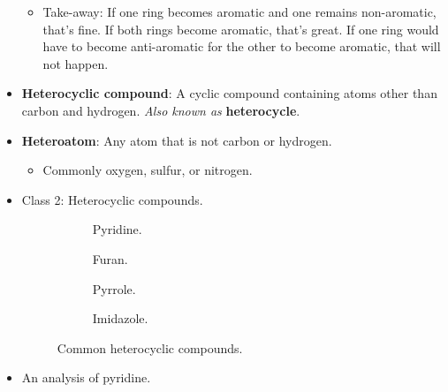 \documentclass[../notes.tex]{subfiles}
\begin{document}
\begin{itemize}
\begin{itemize}
        \item Take-away: If one ring becomes aromatic and one remains non-aromatic, that's fine. If both rings become aromatic, that's great. If one ring would have to become anti-aromatic for the other to become aromatic, that will not happen.
    \end{itemize}
    \item \textbf{Heterocyclic compound}: A cyclic compound containing atoms other than carbon and hydrogen. \emph{Also known as} \textbf{heterocycle}.
    \item \textbf{Heteroatom}: Any atom that is not carbon or hydrogen.
    \begin{itemize}
        \item Commonly oxygen, sulfur, or nitrogen.
    \end{itemize}
    \item Class 2: Heterocyclic compounds.
    \begin{figure}[H]
        \centering
        \footnotesize
        \begin{subfigure}[b]{0.15\linewidth}
            \centering
            \caption{Pyridine.}
            \label{fig:commonHeterocyclesa}
        \end{subfigure}
        \begin{subfigure}[b]{0.15\linewidth}
            \centering
            \caption{Furan.}
            \label{fig:commonHeterocyclesb}
        \end{subfigure}
        \begin{subfigure}[b]{0.15\linewidth}
            \centering
            \vspace{1em}
            \caption{Pyrrole.}
            \label{fig:commonHeterocyclesc}
        \end{subfigure}
        \begin{subfigure}[b]{0.15\linewidth}
            \centering
            \vspace{1em}
            \caption{Imidazole.}
            \label{fig:commonHeterocyclesd}
        \end{subfigure}
        \caption{Common heterocyclic compounds.}
        \label{fig:commonHeterocycles}
    \end{figure}
    \item An analysis of pyridine.
    \begin{figure}[h!]

\end{figure}
\end{itemize}
\end{document}
